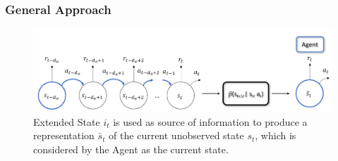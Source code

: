             \subsubsection{General Approach}
                \label{subsubs:mbapproach:general}
                \begin{figure}[b]
                    \centering
                    \includegraphics[width=15cm, keepaspectratio]{images/dmdp/modelbased_i_t.png}
                    \caption{Extended State $i_{t}$ is used as source of information to produce a representation $\bar{s}_t$ of the current unobserved state $s_t$, which is considered by the Agent as the current state.}
                    \label{fig:modelbased_i_t}
                \end{figure}
                

